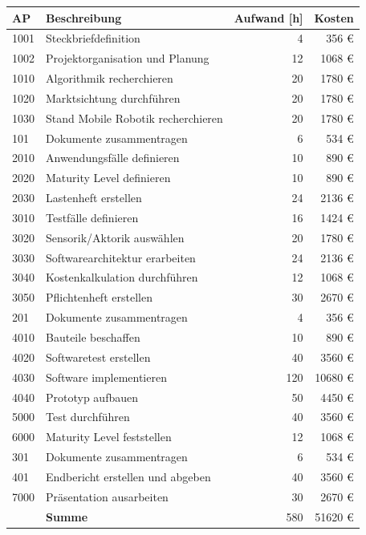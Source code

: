\documentclass[
  a4paper,
  12pt,
  DIV=12,        %
  parskip=half,  %
  headings=small %
]{scrartcl}
\theoremstyle{definition}
\theoremstyle{definition}
\begin{document}
\begin{tabularx}{\textwidth}{lX@{}rr}
\toprule
\textbf{AP} & \textbf{Beschreibung} & \textbf{Aufwand [h]} & \textbf{Kosten} \\
\midrule
1001 & Steckbriefdefinition & 4 & 356 \euro \\
1002 & Projektorganisation und Planung & 12 & 1068 \euro \\
1010 & Algorithmik recherchieren & 20 &1780 \euro \\
1020 & Marktsichtung durchführen & 20 &1780 \euro \\
1030 & Stand Mobile Robotik recherchieren & 20 &1780 \euro \\
101 & Dokumente zusammentragen & 6 & 534 \euro\\
2010 & Anwendungsfälle definieren & 10 & 890 \euro\\
2020 & Maturity Level definieren & 10 & 890 \euro\\
2030 & Lastenheft erstellen & 24 & 2136 \euro\\
3010 & Testfälle definieren & 16 & 1424 \euro\\
3020 & Sensorik/Aktorik auswählen & 20 & 1780 \euro\\
3030 & Softwarearchitektur erarbeiten & 24 & 2136 \euro\\
3040 & Kostenkalkulation durchführen & 12 & 1068 \euro\\
3050 & Pflichtenheft erstellen & 30 & 2670 \euro\\
201 & Dokumente zusammentragen & 4 & 356 \euro\\
4010 & Bauteile beschaffen & 10 & 890 \euro\\
4020 & Softwaretest erstellen & 40 & 3560 \euro\\
4030 & Software implementieren & 120 & 10680 \euro\\
4040 & Prototyp aufbauen & 50 & 4450 \euro\\
5000 & Test durchführen & 40 & 3560 \euro\\
6000 & Maturity Level feststellen & 12 & 1068 \euro\\
301 & Dokumente zusammentragen & 6 & 534 \euro\\
401 & Endbericht erstellen und abgeben & 40 & 3560 \euro\\
7000 & Präsentation ausarbeiten & 30 & 2670 \euro\\
& \textbf{Summe} & 580 & 51620 \euro\\
\bottomrule
\end{tabularx}
\end{document}
